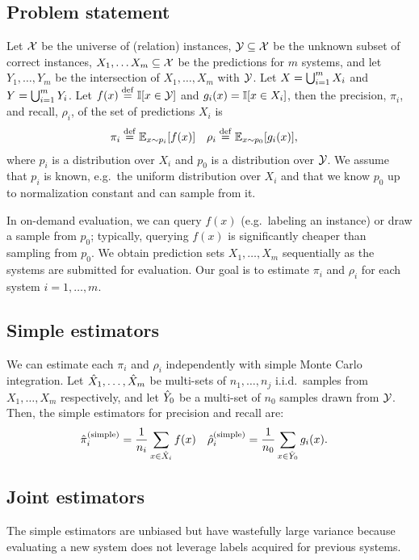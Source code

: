 \subsection{Problem statement}
Let $\mathcal{X}$ be the universe of %
(relation) instances,
  $\mathcal{Y} \subseteq \mathcal{X}$ be the unknown subset of correct instances,
  $X_1, \ldots X_m \subseteq \mathcal{X}$ be the predictions for $m$ systems,
  and let $Y_1, \ldots, Y_m$ be the intersection of $X_1, \ldots, X_m$ with $\mathcal{Y}$.
Let $X = \bigcup_{i=1}^m X_i$ and $Y = \bigcup_{i=1}^m Y_i$.
Let $f(x) \stackrel{\rm def}{=} \mathbb{I}[x \in \mathcal{Y}]$ and $g_i(x) = \mathbb{I}[x \in X_i]$, then the precision, $\pi_i$, and recall, $\rho_i$, of the set of predictions $X_i$ is
\begin{align*}
  \pi_i  &\stackrel{\rm def}{=} \mathbb{E}_{x \sim p_i}[f(x)] &
  \rho_i &\stackrel{\rm def}{=} \mathbb{E}_{x \sim p_0}[g_i(x)],
\end{align*}
where $p_i$ is a distribution over $X_i$ and $p_0$ is a distribution over $\mathcal{Y}$.
We assume that $p_i$ is known, e.g.\, the uniform distribution over $X_i$
and that we know $p_0$ up to normalization constant and can sample from it.

In on-demand evaluation, we can query $f(x)$ (e.g.\, labeling an instance) or draw a sample from $p_0$;
typically, querying $f(x)$ is significantly cheaper than sampling from $p_0$.
We obtain prediction sets $X_1, \ldots, X_m$ sequentially as the systems are submitted for evaluation.
Our goal is to estimate $\pi_i$ and $\rho_i$ for each system $i = 1, \dots, m$.

\subsection{Simple estimators}
We can estimate each $\pi_i$ and $\rho_i$ independently with simple Monte Carlo integration. %
Let ${\hat{X}}_1, \ldots, {\hat{X}}_m$ be multi-sets of $n_1, \ldots, n_j$ i.i.d.~samples from $X_1, \ldots, X_m$ respectively, and let ${\hat{Y}}_0$ be a multi-set of $n_0$ samples drawn from $\mathcal{Y}$.
Then, the simple estimators for precision and recall are:
\begin{align}
  {\hat{\pi}}_i^{\text{(simple)}} &= \frac1{n_i} \sum_{x \in {\hat{X}}_i} f(x) & {\hat{\rho}}_i^{\text{(simple)}} &= \frac1{n_0} \sum_{x \in {\hat{Y}}_0} g_i(x).
\end{align}

\subsection{Joint estimators}
The simple estimators are unbiased but have wastefully large variance
because evaluating a new system does not leverage labels acquired for previous
systems.  %

